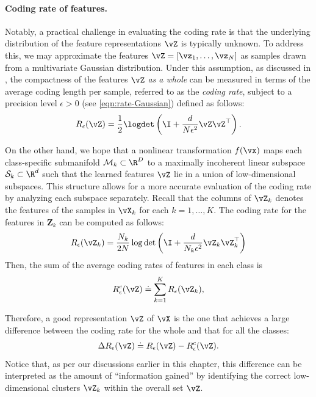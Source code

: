 \documentclass[../../book-main.tex]{subfiles}
\begin{document}
\paragraph{Coding rate of features.} Notably, a practical challenge
in evaluating the coding rate is that the underlying distribution of
the feature representations $\vZ$ is typically unknown. To address
this, we may approximate the features $\vZ = [\vz_1, \ldots, \vz_N]$ as
samples drawn from a multivariate Gaussian distribution. Under this
assumption, as discussed in , the compactness
of the features $\vZ$ {\em as a whole} can be measured in terms of the
average coding length per sample, referred to as the {\em coding
rate}, subject to a precision level $\epsilon > 0$ (see
\eqref{eqn:rate-Gaussian}) defined as follows:
\begin{equation}
    R_{\epsilon}(\vZ) = \frac{1}{2}\logdet\left(\I +
    \frac{d}{N\epsilon^{2}}\vZ\vZ^{\top}\right).
    \label{chap4-eqn:coding-length-eval}
\end{equation}

On the other hand, we hope that a nonlinear transformation $f(\vx)$
maps each class-specific submanifold $\mathcal{M}_k \subset
\R^D$ to a maximally incoherent linear subspace
$\mathcal{S}_k \subset \R^d$ such that the learned features
$\vZ$ lie in a union of low-dimensional subspaces. This structure
allows for a more accurate evaluation of the coding rate by analyzing
each subspace separately. %
Recall that the columns of $\vZ_k$ denotes the features of the samples
in $\vX_k$ for each $k=1,\dots,K$. The coding rate for the features in
$\bm Z_k$ can be computed as follows:
\begin{align}
    R_{\epsilon}(\vZ_k) = \frac{N_k}{2N}\log\det\left(\I +
    \frac{d}{N_k\epsilon^{2}}\vZ_k\vZ_k^{\top}\right)
\end{align}
Then, the sum of the average coding rates of features in each class is
\begin{equation}
    R_{\epsilon}^c(\vZ) \doteq \sum_{k=1}^K R_{\epsilon}(\vZ_k),
    \label{chap4-eqn:compress-loss-eval}
\end{equation}

Therefore, a good representation $\vZ$ of $\vX$ is the one that
achieves a large difference between the coding rate for the whole and
that for all the classes:
\begin{equation}
    \Delta R_{\epsilon}(\vZ) \doteq R_{\epsilon}(\vZ) - R_{\epsilon}^c(\vZ).
    \label{chap4-eqn:coding-length-reduction}
\end{equation}
Notice that, as per our discussions earlier in this chapter, this
difference can be interpreted as the amount of ``information gained''
by identifying the correct low-dimensional clusters $\vZ_k$ within the
overall set $\vZ$.
\end{document}
